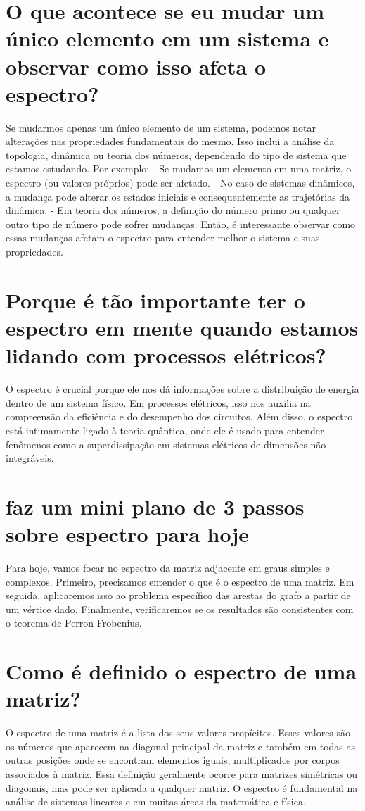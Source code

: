 \documentclass[11pt,a4paper]{article}
\begin{document}
\section{O que acontece se eu mudar um único elemento em um sistema e observar como isso afeta o espectro?}
Se mudarmos apenas um único elemento de um sistema, podemos notar alterações nas propriedades fundamentais do mesmo. Isso inclui a análise da topologia, dinâmica ou teoria dos números, dependendo do tipo de sistema que estamos estudando. Por exemplo: - Se mudamos um elemento em uma matriz, o espectro (ou valores próprios) pode ser afetado. - No caso de sistemas dinâmicos, a mudança pode alterar os estados iniciais e consequentemente as trajetórias da dinâmica. - Em teoria dos números, a definição do número primo ou qualquer outro tipo de número pode sofrer mudanças. Então, é interessante observar como essas mudanças afetam o espectro para entender melhor o sistema e suas propriedades.

\section{Porque é tão importante ter o espectro em mente quando estamos lidando com processos elétricos?}
O espectro é crucial porque ele nos dá informações sobre a distribuição de energia dentro de um sistema físico. Em processos elétricos, isso nos auxilia na compreensão da eficiência e do desempenho dos circuitos. Além disso, o espectro está intimamente ligado à teoria quântica, onde ele é usado para entender fenômenos como a superdissipação em sistemas elétricos de dimensões não-integráveis.

\section{faz um mini plano de 3 passos sobre espectro para hoje}
Para hoje, vamos focar no espectro da matriz adjacente em graus simples e complexos. Primeiro, precisamos entender o que é o espectro de uma matriz. Em seguida, aplicaremos isso ao problema específico das arestas do grafo a partir de um vértice dado. Finalmente, verificaremos se os resultados são consistentes com o teorema de Perron-Frobenius.

\section{Como é definido o espectro de uma matriz?}
O espectro de uma matriz é a lista dos seus valores propícitos. Esses valores são os números que aparecem na diagonal principal da matriz e também em todas as outras posições onde se encontram elementos iguais, multiplicados por corpos associados à matriz. Essa definição geralmente ocorre para matrizes simétricas ou diagonais, mas pode ser aplicada a qualquer matriz. O espectro é fundamental na análise de sistemas lineares e em muitas áreas da matemática e física.
\end{document}
